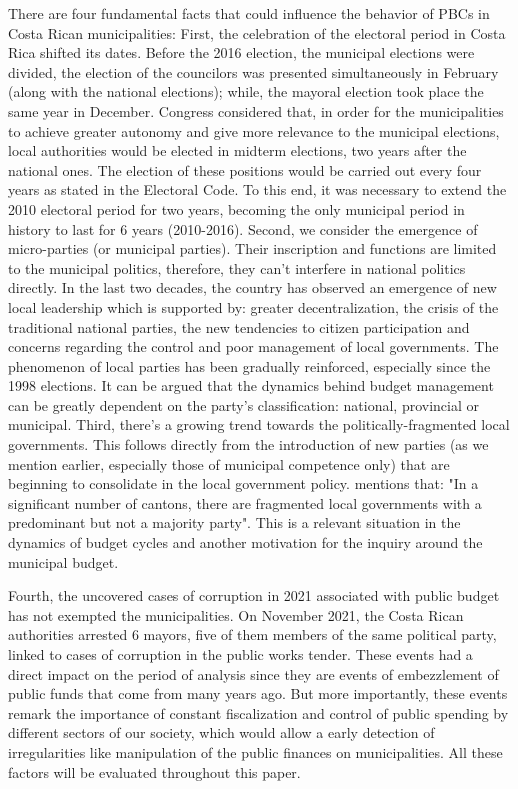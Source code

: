 There are four fundamental facts that could influence the behavior of PBCs in Costa Rican municipalities: First, the celebration of the electoral period in Costa Rica shifted its dates. Before the 2016 election, the municipal elections were divided, the election of the councilors was presented simultaneously in February (along with the national elections); while, the mayoral election took place the same year in December. Congress considered that, in order for the municipalities to achieve greater autonomy and give more relevance to the municipal elections, local authorities would be elected in midterm elections, two years after the national ones. The election of these positions would be carried out every four years as stated in the Electoral Code. \parencite[Art. 150]{al2009} To this end, it was necessary to extend the 2010 electoral period for two years, becoming the only municipal period in history to last for 6 years (2010-2016). 
Second, we consider the emergence of micro-parties (or municipal parties). Their inscription and functions are limited to the municipal politics, therefore, they can't interfere in national politics directly. In the last two decades, the country has observed an emergence of new local leadership which is supported by: greater decentralization, the crisis of the traditional national parties, the new tendencies to citizen participation and concerns regarding the control and poor management of local governments. \parencite[p. 165]{blanco2011} The phenomenon of local parties has been gradually reinforced, especially since the 1998 elections. \parencite[p. 15]{beers2006} It can be argued that the dynamics behind budget management can be greatly dependent on the party's classification: national, provincial or municipal. 
Third, there's a growing trend towards the politically-fragmented local governments. This follows directly from the introduction of new parties (as we mention earlier, especially those of municipal competence only) that are beginning to consolidate in the local government policy. \textcite{blanco2011} mentions that: "In a significant number of cantons, there are fragmented local governments with a predominant but not a majority party".  This is a relevant situation in the dynamics of budget cycles and another motivation for the inquiry around the municipal budget. 

Fourth, the uncovered cases of corruption in 2021 associated with public budget has not exempted the municipalities. On November 2021, the Costa Rican authorities arrested 6 mayors, five of them members of the same political party, linked to cases of corruption in the public works tender. \parencite{molina2021} These events had a direct impact on the period of analysis since they are events of embezzlement of public funds that come from many years ago. But more importantly, these events remark the importance of constant fiscalization and control of public spending by different sectors of our society, which would allow a  early detection of irregularities like manipulation of the public finances on municipalities. All these factors will be evaluated throughout this paper. 
